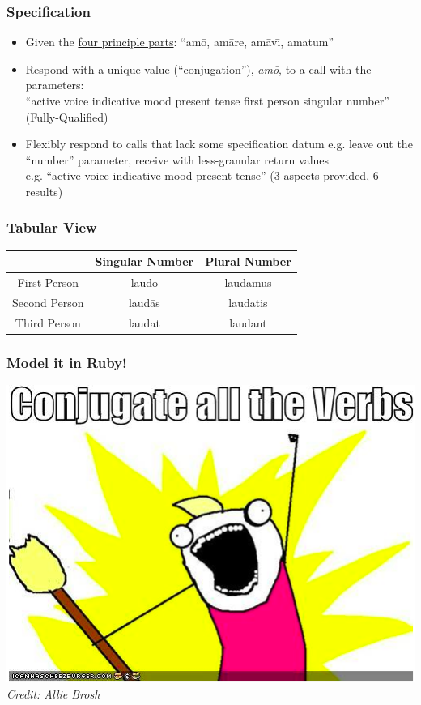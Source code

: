 \documentclass[slidestop,compress,mathserif]{beamer}
\begin{document}
\begin{frame}
	\frametitle{Specification}
	\begin{itemize}
		\item Given the \underline{four principle parts}:  ``am\={o}, am\={a}re, am\={a}v\={\i}, amatum''
		\pause
		\item Respond with a unique value (``conjugation''), \emph{am\={o}}, to a call with the parameters: \\
		``active voice indicative mood present tense first person singular number'' (Fully-Qualified)
		\pause
		\item Flexibly respond to calls that lack some specification datum e.g. leave out the ``number'' parameter, receive with less-granular return values\\
          e.g. ``active voice indicative mood present tense'' (3 aspects provided, 6 results)
	\end{itemize}
\end{frame}

\begin{frame}
	\frametitle{Tabular View}
	\begin{center}
		\begin{tabular}{|c|c|c|}
			\hline
			  & Singular Number &  Plural Number\\
			\hline
			First Person  & laud\={o}  & laud\={a}mus\\
			Second Person & laud\={a}s & laudatis \\
			Third Person  & laudat     & laudant \\
			\hline
		\end{tabular}
	\end{center}
\end{frame}

\begin{frame}
	\frametitle{Model it in Ruby!}
	\begin{center}
		\includegraphics[scale=0.45]{img/brosh_all.png}
		\vskip 0.5cm
		\emph{Credit:  Allie Brosh}
	\end{center}
\end{frame}
\end{document}
